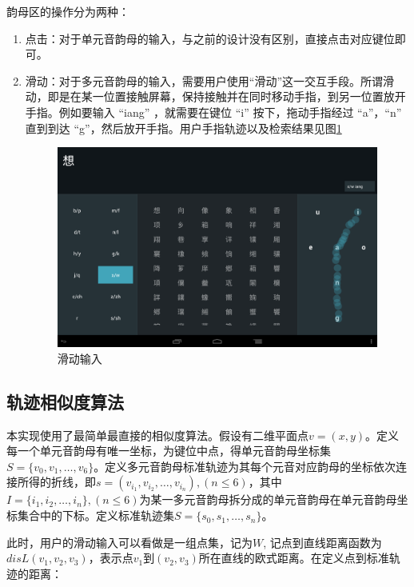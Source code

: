   韵母区的操作分为两种：

  \begin{enumerate}
  \item
  点击：对于单元音韵母的输入，与之前的设计没有区别，直接点击对应键位即可。

  \item
  滑动：对于多元音韵母的输入，需要用户使用“滑动”这一交互手段。所谓滑动，即是在某一位置接触屏幕，保持接触并在同时移动手指，到另一位置放开手指。例如要输入 “iang” ，就需要在键位 “i” 按下，拖动手指经过 “a”，“n” 直到到达 “g”，然后放开手指。用户手指轨迹以及检索结果见图\ref{fig:layout2_input}

  \begin{figure}[h]
  \noindent\includegraphics[width=150mm]{img/layout2_input}
  \caption{滑动输入}
  \label{fig:layout2_input}
  \end{figure}

  \end{enumerate}

  \subsection{轨迹相似度算法\label{sec:tra_algorithm}}

  本实现使用了最简单最直接的相似度算法。假设有二维平面点\(v = (x, y)\)。定义每一个单元音韵母有唯一坐标，为键位中点，得单元音韵母坐标集\(S = \{v_0, v_1, \dots, v_6\}\)。定义多元音韵母标准轨迹为其每个元音对应韵母的坐标依次连接所得的折线，即\(s = (v_{i_1}, v_{i_2}, \dots, v_{i_n}), (n \leq 6)\)，其中\(I = \{i_1, i_2, \dots, i_n\}, (n \leq 6) \)为某一多元音韵母拆分成的单元音韵母在单元音韵母坐标集合中的下标。定义标准轨迹集\(S = \{s_0, s_1, \dots, s_n\}\)。

  此时，用户的滑动输入可以看做是一组点集，记为\(W\), 记点到直线距离函数为\(disL(v_1, v_2, v_3)\)，表示点\(v_1\)到\((v_2, v_3)\)所在直线的欧式距离。在定义点到标准轨迹的距离：


